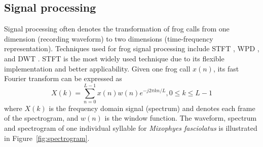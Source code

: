 \subsection{Signal processing}
Signal processing often denotes the transformation of frog calls from one dimension (recording waveform) to two dimensions (time-frequency representation). Techniques used for frog signal processing include STFT \citep{huang2009frog, Huang20141, Colonna20157367}, WPD \citep{yen2002automatic}, and DWT \citep{colonna2012feature}. STFT is the most widely used technique due to its flexible implementation and better applicability. Given one frog call $x(n)$, its fast Fourier transform can be expressed as
\begin{equation}
X(k) = \sum_{n=0}^{L-1}x(n)w(n)e^{-j2 \pi kn/L}, 0 \leq k \leq L-1
\end{equation}
where $X(k)$ is the frequency domain signal (spectrum) and denotes each frame of the spectrogram, and $w(n)$ is the window function. The waveform, spectrum and spectrogram of one individual syllable for \textit{Mixophyes fasciolatus} is illustrated in Figure~\ref{fig:spectrogram}. 

